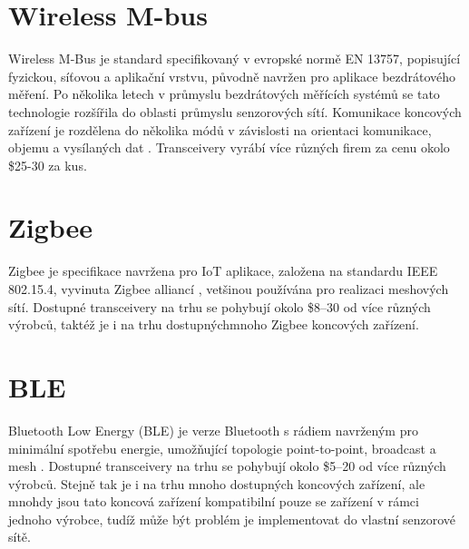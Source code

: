 \section{Wireless M-bus}
Wireless M-Bus je standard specifikovaný v evropské normě EN 13757, popisující fyzickou, síťovou a aplikační vrstvu, původně navržen pro aplikace bezdrátového měření. 
Po několika letech v průmyslu bezdrátových měřících systémů se tato technologie rozšířila do oblasti průmyslu senzorových sítí.
Komunikace koncových zařízení je rozdělena do několika módů v závislosti na orientaci komunikace, objemu a vysílaných dat \cite{wirelessMBus01} \cite{wirelessMBus02}. Transceivery vyrábí více různých firem za cenu okolo \$25-30 za kus.


\section{Zigbee}
Zigbee je specifikace navržena pro IoT aplikace, založena na standardu  IEEE 802.15.4, vyvinuta Zigbee alliancí \cite{Zigbee_alliance}, vetšinou používána pro realizaci meshových sítí.
Dostupné transceivery na trhu se pohybují okolo \$8–30 od více různých výrobců, taktéž je i na trhu dostupnýchmnoho Zigbee koncových zařízení.


\section{BLE}
Bluetooth Low Energy (BLE) je verze Bluetooth s rádiem navrženým pro minimální spotřebu energie, umožňující topologie point-to-point, broadcast a mesh \cite{BT_alliance}.
Dostupné transceivery na trhu se pohybují okolo \$5–20 od více různých výrobců. Stejně tak je i na trhu mnoho dostupných koncových zařízení, ale mnohdy jsou tato koncová zařízení kompatibilní pouze se zařízení v rámci jednoho výrobce, tudíž může být problém je implementovat do vlastní senzorové sítě. 



